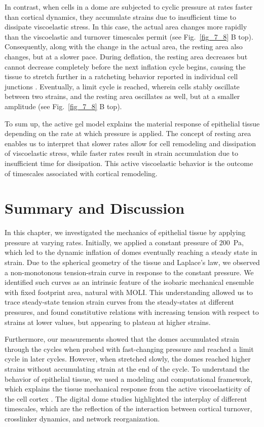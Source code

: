 In contrast, when cells in a dome are subjected to cyclic pressure at rates faster than cortical dynamics, they accumulate strains due to insufficient time to dissipate viscoelastic stress. In this case, the actual area changes more rapidly than the viscoelastic and turnover timescales permit (see Fig.~\ref{fig_7_8} B top). Consequently, along with the change in the actual area, the resting area also changes, but at a slower pace. During deflation, the resting area decreases but cannot decrease completely before the next inflation cycle begins, causing the tissue to stretch further in a ratcheting behavior reported in individual cell junctions \cite{clement2017}. Eventually, a limit cycle is reached, wherein cells stably oscillate between two strains, and the resting area oscillates as well, but at a smaller amplitude (see Fig.~\ref{fig_7_8} B top).

To sum up, the active gel model explains the material response of epithelial tissue depending on the rate at which pressure is applied. The concept of resting area enables us to interpret that slower rates allow for cell remodeling and dissipation of viscoelastic stress, while faster rates result in strain accumulation due to insufficient time for dissipation. This active viscoelastic behavior is the outcome of timescales associated with cortical remodeling.


\hypertarget{summary}{%
	\section{Summary and Discussion}\label{summary}}

In this chapter, we investigated the mechanics of epithelial tissue by applying pressure at varying rates. Initially, we applied a constant pressure of 200~Pa, which led to the dynamic inflation of domes eventually reaching a steady state in strain. Due to the spherical geometry of the tissue and Laplace’s law, we observed a non-monotonous tension-strain curve in response to the constant pressure. We identified such curves as an intrinsic feature of the isobaric mechanical ensemble with fixed footprint area, natural with MOLI. This understanding allowed us to trace steady-state tension strain curves from the steady-states at different pressures, and found constitutive relations with increasing tension with respect to strains at lower values, but appearing to plateau at higher strains. 

Furthermore, our measurements showed that the domes accumulated strain through the cycles when probed with fast-changing pressure and reached a limit cycle in later cycles. However, when stretched slowly, the domes reached higher strains without accumulating strain at the end of the cycle. To understand the behavior of epithelial tissue, we used a modeling and computational framework, which explains the tissue mechanical response from the active viscoelasticity of the cell cortex \cite{ouzeri2023}. The digital dome studies highlighted the interplay of different timescales, which are the reflection of the interaction between cortical turnover, crosslinker dynamics, and network reorganization. 


